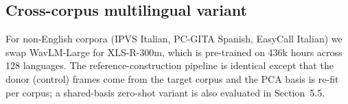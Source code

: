 \subsection{Cross-corpus multilingual variant}
For non-English corpora (IPVS Italian, PC-GITA Spanish, EasyCall
Italian) we swap WavLM-Large for XLS-R-300m, which is pre-trained on
436k hours across 128 languages. The reference-construction pipeline
is identical except that the donor (control) frames come from the
target corpus and the PCA basis is re-fit per corpus; a shared-basis
zero-shot variant is also evaluated in Section~5.5.
